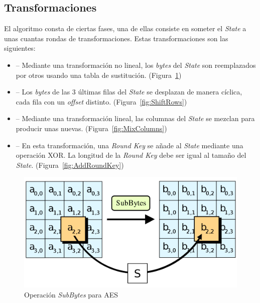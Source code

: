 \subsection{Transformaciones}

El algoritmo consta de ciertas fases, una de ellas consiste en someter el \emph{State} a unas cuantas rondas de transformaciones. Estas transformaciones son las siguientes:

\begin{itemize}
  \item {} -- Mediante una transformación no lineal, los \emph{bytes} del \emph{State} son reemplazados por otros usando una tabla de sustitución. (Figura~\ref{fig:SubBytes})

  \item {} -- Los \emph{bytes} de las 3 últimas filas del \emph{State} se desplazan de manera cíclica, cada fila con un \emph{offset} distinto. (Figura~\ref{fig:ShiftRows})

  \item {} -- Mediante una transformación lineal, las columnas del \emph{State} se mezclan para producir unas nuevas. (Figura~\ref{fig:MixColumns})

  \item {} -- En esta transformación, una \emph{Round Key} se añade al \emph{State} mediante una operación XOR. La longitud de la \emph{Round Key} debe ser igual al tamaño del \emph{State}. (Figura~\ref{fig:AddRoundKey})
\end{itemize}

\begin{figure}[ht]
  \centering
  \includegraphics[scale=0.25]{Figures/SubBytes}
  \decoRule
  \caption[\emph{SubBytes} (AES)]{Operación \emph{SubBytes} para AES \emph{\parencite{Reference27}}}
  \label{fig:SubBytes}
\end{figure}

